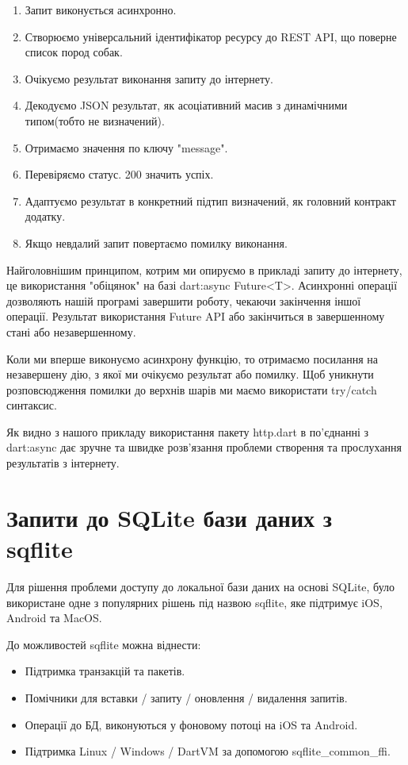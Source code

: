 \begin{enumerate}
    \item Запит виконується асинхронно.
    \item Створюємо універсальний ідентифікатор ресурсу до REST API, що поверне список пород собак.
    \item Очікуємо результат виконання запиту до інтернету.
    \item Декодуємо JSON результат, як асоціативний масив з динамічними типом(тобто не визначений).
    \item Отримаємо значення по ключу "message".
    \item Перевіряємо статус. 200 значить успіх.
    \item Адаптуємо результат в конкретний підтип визначений, як головний контракт додатку.
    \item Якщо невдалий запит повертаємо помилку виконання.
\end{enumerate}

Найголовнішим принципом, котрим ми опируємо в прикладі запиту до інтернету, це використання "обіцянок" на базі dart:async Future<T>.
Асинхронні операції дозволяють нашій програмі завершити роботу, чекаючи закінчення іншої операції.
Результат використання Future API або закінчиться в завершенному стані або незавершенному.

Коли ми вперше виконуємо асинхрону функцію, то отримаємо посилання на незавершену дію, з якої ми очікуємо результат або помилку.
Щоб уникнути розповсюдження помилки до верхнів шарів ми маємо використати try/catch синтаксис.

Як видно з нашого прикладу використання пакету http.dart в по'єднанні з dart:async дає зручне та швидке розв'язання проблеми створення та прослухання результатів з інтернету.


\section{Запити до SQLite бази даних з sqflite}
\label{section.3.4}
Для рішення проблеми доступу до локальної бази даних на основі SQLite,
було використане одне з популярних рішень під назвою sqflite, яке підтримує iOS, Android та MacOS.

До можливостей sqflite можна віднести:

\begin{itemize}
    \item Підтримка транзакцій та пакетів.
    \item Помічники для вставки / запиту / оновлення / видалення запитів.
    \item Операції до БД, виконуються у фоновому потоці на iOS та Android.
    \item Підтримка Linux / Windows / DartVM за допомогою sqflite_common_ffi.
\end{itemize}

